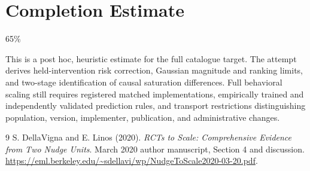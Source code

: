 \documentclass[11pt]{article}
\theoremstyle{remark}
\begin{document}
\section{Completion Estimate}
65\%

This is a post hoc, heuristic estimate for the full catalogue target.
The attempt derives held-intervention risk correction, Gaussian magnitude and ranking limits, and two-stage identification of causal saturation differences. Full behavioral scaling still requires registered matched implementations, empirically trained and independently validated prediction rules, and transport restrictions distinguishing population, version, implementer, publication, and administrative changes.

\begin{thebibliography}{9}
 S. DellaVigna and E. Linos (2020). \emph{RCTs to Scale: Comprehensive Evidence from Two Nudge Units}. March 2020 author manuscript, Section 4 and discussion. \url{https://eml.berkeley.edu/~sdellavi/wp/NudgeToScale2020-03-20.pdf}.
\end{thebibliography}
\end{document}
